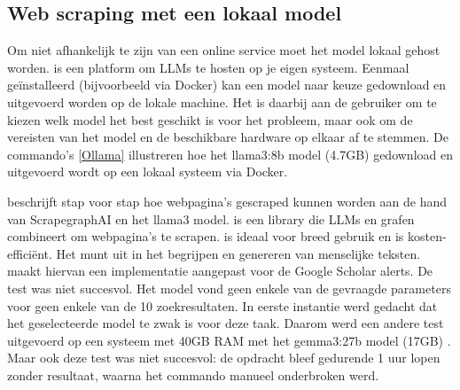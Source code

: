 \subsection{Web scraping met een lokaal model}
Om niet afhankelijk te zijn van een online service moet het model lokaal gehost worden. \textcite{Ollama2025} is een platform om LLMs te hosten op je eigen systeem. Eenmaal geïnstalleerd (bijvoorbeeld via Docker) kan een model naar keuze gedownload en uitgevoerd worden op de lokale machine.
Het is daarbij aan de gebruiker om te kiezen welk model het best geschikt is voor het probleem, maar ook om de vereisten van het model en de beschikbare hardware op elkaar af te stemmen. De commando's \ref{Ollama} illustreren hoe het llama3:8b model (4.7GB) gedownload en uitgevoerd wordt op een lokaal systeem via Docker.
\begin{listing}
    docker exec -it ollama ollama pull llama3:8b
    docker exec -it ollama ollama run llama3
    \caption[Ollama]Ollama}
    \label{Ollama}
\end{listing}
\textcite{Scrapegraphaillama2025} beschrijft stap voor stap hoe webpagina's gescraped kunnen worden aan de hand van ScrapegraphAI en het llama3 model.
\textcite{ScrapeGraphAI2025} is een library die LLMs en grafen combineert om webpagina's te scrapen. \textcite{Llama32025} is ideaal voor breed gebruik en is kosten-efficiënt. Het munt uit in het begrijpen en genereren van menselijke teksten.
\textcite{Depaepeollama2025} maakt hiervan een implementatie aangepast voor de Google Scholar alerts.
De test was niet succesvol. Het model vond geen enkele van de gevraagde parameters voor geen enkele van de 10 zoekresultaten.
In eerste instantie werd gedacht dat het geselecteerde model te zwak is voor deze taak. Daarom werd een andere test uitgevoerd op een systeem met 40GB RAM met het gemma3:27b model (17GB) \autocite{Gemma32025}. Maar ook deze test was niet succesvol: de opdracht bleef gedurende 1 uur lopen zonder resultaat, waarna het commando manueel onderbroken werd. 
